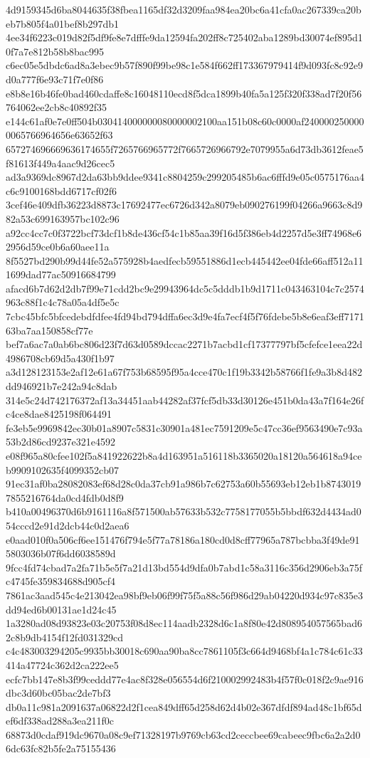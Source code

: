 {4d9159345d6ba8044635f38fbea1165df32d3209faa984ea20bc6a41cfa0ac267339ca20beb7b805f4a01bef8b297db1
4ee34f6223c019d82f5df9fe8e7dfffe9da12594fa202ff8c725402aba1289bd30074ef895d10f7a7e812b58b8bac995
c6ec05e5dbdc6ad8a3ebec9b57f890f99be98c1e584f662ff173367979414f9d093fc8c92e9d0a777f6e93c71f7e0f86
e8b8e16b46fe0bad460cdaffe8c16048110ecd8f5dca1899b40fa5a125f320f338ad7f20f56764062ee2cb8c40892f35
e144c61af0e7e0ff504b030414000000080000002100aa151b08c60c0000af2400002500000065766964656e63652f63
657274696669636174655f7265766965772f7665726966792e7079955a6d73db3612feae5f81613f449a4aac9d26cec5
ad3a9369dc8967d2da63bb9ddee9341c8804259c299205485b6ac6fffd9e05c0575176aa4c6c9100168bdd6717cf02f6
3cef46e409dfb36223d8873c17692477ec6726d342a8079eb090276199f04266a9663c8d982a53c699163957bc102c96
a92cc4cc7c0f3722bcf73dcf1b8de436cf54c1b85aa39f16d5f386eb4d2257d5e3ff74968e62956d59ce0b6a60aee11a
8f5527bd290b99d44fe52a575928b4aedfecb59551886d1ecb445442ee04fde66aff512a111699dad77ac50916684799
afacd6b7d62d2db7f99e71cdd2bc9e29943964dc5c5dddb1b9d1711c043463104c7c2574963c88f1c4c78a05a4df5e5c
7cbc45bfc5bfcedebdfdfee4fd94bd794dffa6ec3d9e4fa7ecf4f5f76fdebe5b8e6eaf3eff717163ba7aa150858cf77e
bef7a6ac7a0ab6bc806d23f7d63d0589dccac2271b7acbd1cf17377797bf5cfefce1eea22d4986708cb69d5a430f1b97
a3d128123153e2af12e61a67f753b68595f95a4cce470c1f19b3342b58766f1fe9a3b8d482dd946921b7e242a94c8dab
314e5c24d742176372af13a34451aab44282af37fcf5db33d30126e451b0da43a7f164e26fc4ce8dae8425198f064491
fe3eb5e9969842ec30b01a8907c5831c30901a481ec7591209e5c47cc36ef9563490e7c93a53b2d86cd9237e321e4592
e08f965a80cfee102f5a841922622b8a4d163951a516118b3365020a18120a564618a94ceb9909102635f4099352cb07
91ec31af0ba28082083ef68d28c0da37cb91a986b7c62753a60b55693eb12eb1b87430197855216764da0cd4fdb0d8f9
b410a00496370d6b9161116a8f571500ab57633b532c7758177055b5bbdf632d4434ad054cccd2e91d2dcb44c0d2aea6
e0aad010f0a506cf6ee151476f794e5f77a78186a180cd0d8cff77965a787bcbba3f49de915803036b07f6dd6038589d
9fcc4fd74cbad7a2fa71b5e5f7a21d13bd554d9dfa0b7abd1c58a3116c356d2906eb3a75fc4745fe359834688d905cf4
7861ac3aad545c4e213042ea98bf9eb06f99f75f5a88c56f986d29ab04220d934c97c835e3dd94ed6b00131ae1d24c45
1a3280ad08d93823e03c20753f08d8ec114aadb2328d6c1a8f80e42d808954057565bad62c8b9db4154f12fd031329cd
c4c483003294205c9935bb30018c690aa90ba8cc7861105f3c664d9468bf4a1c784c61c33414a47724c362d2ca222ee5
ecfc7bb147e8b3f99ceddd77e4ac8f328e056554d6f210002992483b4f57f0c018f2c9ae916dbc3d60bc05bac2de7bf3
db0a11c981a2091637a06822d2f1cea849dff65d258d62d4b02e367dfdf894ad48c1bf65def6df338ad288a3ea211f0c
68873d0cdaf919dc9670a08c9ef71328197b9769cb63cd2ceccbee69cabeec9fbc6a2a2d06dc63fc82b5fe2a75155436
}
